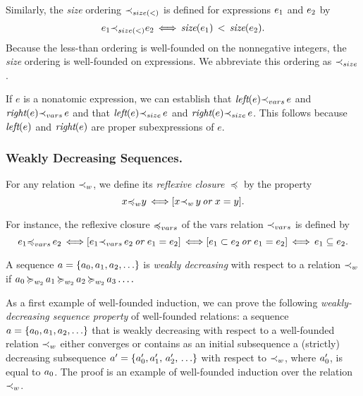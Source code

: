 \documentclass[runningheads]{llncs}
\DeclareMathOperator{\uor}{\emph{or}\,}
\DeclareMathOperator{\uiff}{\iff}
\DeclareMathOperator{\lef}{\emph{left}}
\DeclareMathOperator{\rig}{\emph{right}}
\begin{document}
Similarly, the \emph{size} ordering ${\prec}_{size(<)}$  is defined for expressions $e_{1}$ and $e_{2}$ by
\[   \expsub{e}{1}    \expsub{\prec}{size(<)} \expsub{e}{2} \uiff \size(\expsub{e}{1}) \, < \, \size(\expsub{e}{2}).\]
Because the less-than ordering is well-founded on the nonnegative integers, the \emph{size} ordering is well-founded on expressions. We abbreviate this ordering  as ${\prec}_{size}$. 

If $e$ is a nonatomic expression, we can establish that
$\lef(e) \expsub{\prec}{vars}\, e$ and \allowbreak $\rig(e) \expsub{\prec}{vars}\, e$ and that $\lef(e) \expsub{\prec}{size}\, e$ and \allowbreak $\rig(e) \expsub{\prec}{size}\, e$. This follows because $\lef(e)$ and $\rig(e)$ are proper subexpressions of $e$.

  
\subsubsection{Weakly Decreasing Sequences.}  

 
  For any relation ${\prec}_{w}$, we define its \emph{reflexive closure} $\preccurlyeq$ by the property
 \[\var{x} \expsub {\preccurlyeq}{w} \var{y} \uiff 
 [\var{x} \expsub{\prec}{ w} \, \var{y} \uor  \var{x} = \var{y}].\] 

 \noindent For instance, the reflexive closure ${\preccurlyeq}_{vars}$ of the vars relation ${\prec}_{vars}$ is defined by
 \[ \expsub{e}{1} \expsub{\preccurlyeq}{vars}\, \expsub{e}{2} \uiff  
[\expsub{e}{1} \expsub{\prec}{ vars} \, \expsub{e}{2} \uor  \expsub{e}{1} = \expsub{e}{2}] \uiff
[\expsub{e}{1} \subset \expsub{e}{2} \uor  \expsub{e}{1} = \expsub{e}{2}] \uiff
 \expsub{e}{1} \subseteq \expsub{e}{2}. \]

A sequence $a = \{{a}_{0}, {a}_{1}, {a}_{2}, \ldots\}$ is \emph{weakly decreasing}
 with respect to a relation ${\prec}_{w}$ if 
 ${a}_{0} \, {\succcurlyeq}_{{w}_{2}} \, {a}_{1} \, {\succcurlyeq}_{{w}_{2}} \, {a}_{2} \, {\succcurlyeq}_{{w}_{2}} \, {a}_{3} \ldots. $  
 
 As a first example of well-founded induction, we can prove the following \emph{weakly-decreasing sequence property} of well-founded relations: 
 a sequence $a = \{{a}_{0}, {a}_{1}, {a}_{2}, \ldots\}$ that is weakly decreasing with respect to a well-founded relation ${\prec}_{w}$ either converges or contains as an initial subsequence a (strictly) decreasing subsequence $a' = \{{a}_{0}',  {a}_{1}',\, {a}_{2}',\, \ldots\}  $ with respect to ${\prec}_{w}$, where ${a}_{0}'$, is equal to ${a}_{0}$.  The proof is an example of well-founded induction over the relation ${\prec}_{w}$.  
 
\end{document}
